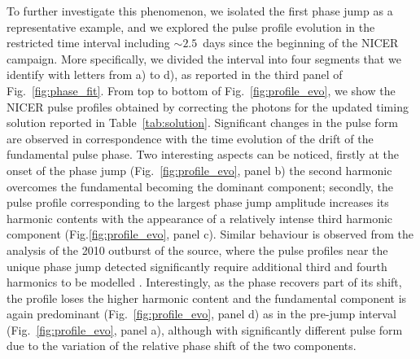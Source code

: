 \documentclass[fleqn,usenatbib]{mnras}
\newcommand{\nicer}{NICER}
\begin{document}
To further investigate this phenomenon, we isolated the first phase jump as a representative example, and we explored the pulse profile evolution in the restricted time interval including $\sim2.5$~days since the beginning of the \nicer{} campaign. More specifically, we divided the interval into four segments that we identify with letters from a) to d), as reported in the third panel of Fig.~\ref{fig:phase_fit}. From top to bottom of Fig.~\ref{fig:profile_evo}, we show the \nicer{} pulse profiles obtained by correcting the photons for the updated timing solution reported in Table~\ref{tab:solution}. Significant changes in the pulse form are observed in correspondence with the time evolution of the drift of the fundamental pulse phase. Two interesting aspects can be noticed, firstly at the onset of the phase jump (Fig.~\ref{fig:profile_evo}, panel b) the second harmonic overcomes the fundamental becoming the dominant component; secondly, the pulse profile corresponding to the largest phase jump amplitude increases its harmonic contents with the appearance of a relatively intense third harmonic component (Fig.\ref{fig:profile_evo}, panel c). Similar behaviour is observed from the analysis of the 2010 outburst of the source, where the pulse profiles near the unique phase jump detected significantly require additional third and fourth harmonics to be modelled \citep{Altamirano:2011uq}. Interestingly, as the phase recovers part of its shift, the profile loses the higher harmonic content and the fundamental component is again predominant (Fig.~\ref{fig:profile_evo}, panel d) as in the pre-jump interval (Fig.~\ref{fig:profile_evo}, panel a), although with significantly different pulse form due to the variation of the relative phase shift of the two components.   
\end{document}
